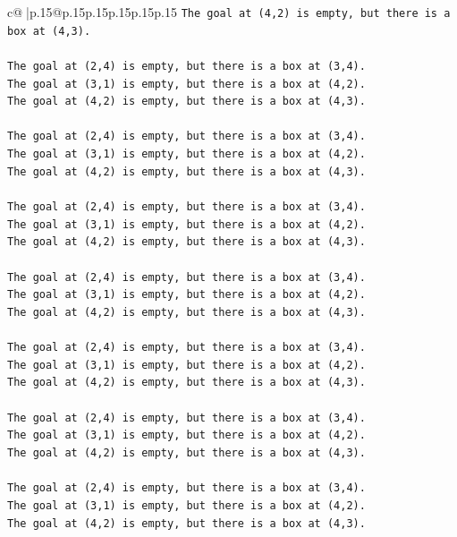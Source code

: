 \documentclass{article}
\begin{document}
{\begin{supertabular}{c@{$\;$}|p{.15\linewidth}@{}p{.15\linewidth}p{.15\linewidth}p{.15\linewidth}p{.15\linewidth}p{.15\linewidth}}
{{{\texttt{The goal at (4,2) is empty, but there is a box at (4,3).} \\
\\ 
\texttt{The goal at (2,4) is empty, but there is a box at (3,4).} \\
\texttt{The goal at (3,1) is empty, but there is a box at (4,2).} \\
\texttt{The goal at (4,2) is empty, but there is a box at (4,3).} \\
\\ 
\texttt{The goal at (2,4) is empty, but there is a box at (3,4).} \\
\texttt{The goal at (3,1) is empty, but there is a box at (4,2).} \\
\texttt{The goal at (4,2) is empty, but there is a box at (4,3).} \\
\\ 
\texttt{The goal at (2,4) is empty, but there is a box at (3,4).} \\
\texttt{The goal at (3,1) is empty, but there is a box at (4,2).} \\
\texttt{The goal at (4,2) is empty, but there is a box at (4,3).} \\
\\ 
\texttt{The goal at (2,4) is empty, but there is a box at (3,4).} \\
\texttt{The goal at (3,1) is empty, but there is a box at (4,2).} \\
\texttt{The goal at (4,2) is empty, but there is a box at (4,3).} \\
\\ 
\texttt{The goal at (2,4) is empty, but there is a box at (3,4).} \\
\texttt{The goal at (3,1) is empty, but there is a box at (4,2).} \\
\texttt{The goal at (4,2) is empty, but there is a box at (4,3).} \\
\\ 
\texttt{The goal at (2,4) is empty, but there is a box at (3,4).} \\
\texttt{The goal at (3,1) is empty, but there is a box at (4,2).} \\
\texttt{The goal at (4,2) is empty, but there is a box at (4,3).} \\
\\ 
\texttt{The goal at (2,4) is empty, but there is a box at (3,4).} \\
\texttt{The goal at (3,1) is empty, but there is a box at (4,2).} \\
\texttt{The goal at (4,2) is empty, but there is a box at (4,3).} \\
}}}
\end{supertabular}}
\end{document}
